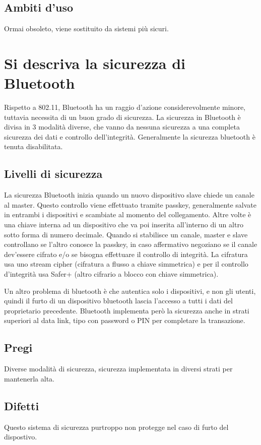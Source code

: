 \subsection{Ambiti d'uso}
Ormai obsoleto, viene sostituito da sistemi più sicuri.

\section{Si descriva la sicurezza di Bluetooth}

Rispetto a 802.11, Bluetooth ha un raggio d'azione considerevolmente minore, tuttavia necessita di un buon grado di sicurezza.
La sicurezza in Bluetooth è divisa in 3 modalità diverse, che vanno da nessuna sicurezza a una completa sicurezza dei dati e controllo dell'integrità.
Generalmente la sicurezza bluetooth è tenuta disabilitata.
\subsection{Livelli di sicurezza}
La sicurezza Bluetooth inizia quando un nuovo dispositivo slave chiede un canale al master.
Questo controllo viene effettuato tramite passkey, generalmente salvate in entrambi i dispositivi e scambiate al momento del collegamento. Altre volte è una chiave interna ad un dispositivo che va poi inserita all'interno di un altro sotto forma di numero decimale.
Quando si stabilisce un canale, master e slave controllano se l'altro conosce la passkey, in caso affermativo negoziano se il canale dev'essere cifrato e/o se bisogna effettuare il controllo di integrità.
La cifratura usa uno stream cipher (cifratura a flusso a chiave simmetrica) e per il controllo d'integrità usa Safer+ (altro cifrario a blocco con chiave simmetrica).

Un altro problema di bluetooth è che autentica solo i dispositivi, e non gli utenti, quindi il furto di un dispositivo bluetooth lascia l'accesso a tutti i dati del proprietario precedente.
Bluetooth implementa però la sicurezza anche in strati superiori al data link, tipo con password o PIN per completare la transazione.

\subsection{Pregi}
Diverse modalità di sicurezza, sicurezza implementata in diversi strati per mantenerla alta.
\subsection{Difetti}
Questo sistema di sicurezza purtroppo non protegge nel caso di furto del dispostivo.
